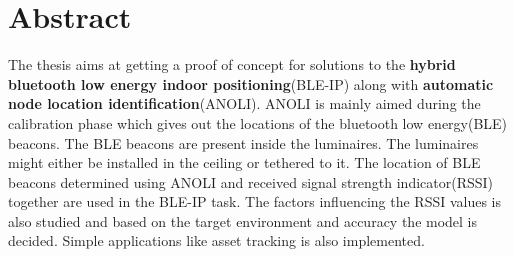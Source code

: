 \section{Abstract}
The thesis aims at getting a proof of concept for solutions to the \textbf{hybrid bluetooth low energy indoor positioning}(BLE-IP) along with \textbf{automatic node location identification}(ANOLI). ANOLI is mainly aimed during the calibration phase which gives out the locations of the bluetooth low energy(BLE) beacons. The BLE beacons are present inside the luminaires. The luminaires might either be installed in the ceiling or tethered to it. The location of BLE beacons determined using ANOLI and received signal strength indicator(RSSI) together are used in the BLE-IP task. The factors influencing the RSSI values is also studied and based on the target environment and accuracy the model is decided.  Simple applications like asset tracking is also implemented.